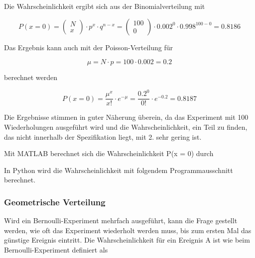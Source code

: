 \noindent Die Wahrscheinlichkeit ergibt sich aus der Binomialverteilung mit 

\begin{equation}\label{eq:fourhundredfiftytwo}
P\left(x=0\right)=\left(\begin{array}{l} {N} \\ 
{x} \end{array}\right)\cdot p^{x} \cdot q^{n-x} =\left(\begin{array}{l} {100} \\ 
{0} \end{array}\right)\cdot 0.002^{0} \cdot 0.998^{100-0} =0.8186
\end{equation}

\noindent Das Ergebnis kann auch mit der Poisson-Verteilung f\"{u}r 

\begin{equation}\label{eq:fourhundredfiftythree}
\mu =N\cdot p=100\cdot 0.002=0.2
\end{equation}

\noindent berechnet werden

\begin{equation}\label{eq:fourhundredfiftyfour}
P(x=0)=\dfrac{\mu ^{x} }{x!} \cdot e^{-\mu} =\dfrac{0.2^{0} }{0!} \cdot e^{-0.2} =0.8187
\end{equation}

\noindent Die Ergebnisse stimmen in guter N\"{a}herung \"{u}berein, da das Experiment mit 100 Wiederholungen ausgef\"{u}hrt wird und die Wahrscheinlichkeit, ein Teil zu finden, das nicht innerhalb der Spezifikation liegt, mit 2. sehr gering ist.\newline

\noindent Mit MATLAB berechnet sich die Wahrscheinlichkeit P(x = 0) durch



\noindent In Python wird die Wahrscheinlichkeit mit folgendem Programmausschnitt berechnet.



\subsubsection{Geometrische Verteilung}

\noindent Wird ein Bernoulli-Experiment mehrfach ausgef\"{u}hrt, kann die Frage gestellt werden, wie oft das Experiment wiederholt werden muss, bis zum ersten Mal das g\"{u}nstige Ereignis eintritt. Die Wahrscheinlichkeit f\"{u}r ein Ereignis A ist wie beim Bernoulli-Experiment definiert als

